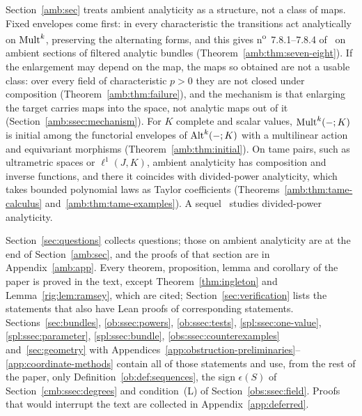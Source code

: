 Section~\ref{amb:sec} treats ambient analyticity as a structure, not a class of maps. Fixed envelopes come first: in every
characteristic the transitions act analytically on $\operatorname{Mult}^k$, preserving the alternating forms, and this gives
n\textsuperscript{o}~7.8.1--7.8.4 of~\cite{Bou} on ambient sections of filtered analytic bundles
(Theorem~\ref{amb:thm:seven-eight}). If the enlargement may depend on the map, the maps so obtained are not a usable class:
over every field of characteristic $p>0$ they are not closed under composition (Theorem~\ref{amb:thm:failure}), and the
mechanism is that enlarging the target carries maps into the space, not analytic maps out of it
(Section~\ref{amb:ssec:mechanism}). For $K$ complete and scalar values, $\operatorname{Mult}^k(-;K)$ is initial among the functorial
envelopes of $\operatorname{Alt}^k(-;K)$ with a multilinear action and equivariant morphisms (Theorem~\ref{amb:thm:initial}). On tame
pairs, such as ultrametric spaces or $\ell^1(J,K)$, ambient analyticity has composition and inverse functions, and there it coincides with
divided-power analyticity, which takes bounded polynomial laws as Taylor coefficients
(Theorems~\ref{amb:thm:tame-calculus} and~\ref{amb:thm:tame-examples}). A sequel~\cite{II} studies divided-power
analyticity.

Section~\ref{sec:questions} collects questions; those on ambient analyticity are at the end of Section~\ref{amb:sec}, and
the proofs of that section are in Appendix~\ref{amb:app}. Every theorem, proposition, lemma and corollary of the paper is proved
in the text, except Theorem~\ref{thm:ingleton} and Lemma~\ref{rig:lem:ramsey}, which are cited;
Section~\ref{sec:verification} lists the statements that also have Lean proofs of corresponding statements.
Sections~\ref{sec:bundles}, \ref{ob:ssec:powers}, \ref{ob:ssec:tests}, \ref{spl:ssec:one-value},
\ref{spl:ssec:parameter}, \ref{spl:ssec:bundle}, \ref{obs:ssec:counterexamples} and~\ref{sec:geometry} with
Appendices~\ref{app:obstruction-preliminaries}--\ref{app:coordinate-methods} contain all of those statements and use, from
the rest of the paper, only Definition~\ref{ob:def:sequences}, the sign $\epsilon(S)$ of Section~\ref{cmb:ssec:degrees} and condition~\textup{(L)} of
Section~\ref{obs:ssec:field}. Proofs
that would interrupt the text are collected in Appendix~\ref{app:deferred}.

